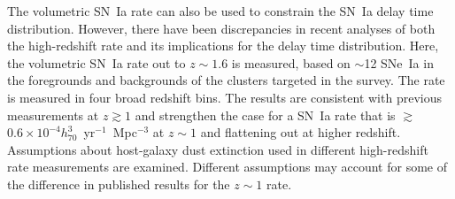 The volumetric SN~Ia rate can also be used to constrain the SN~Ia
delay time distribution. However, there have been discrepancies in
recent analyses of both the high-redshift rate and its implications
for the delay time distribution.  Here, the volumetric SN~Ia rate out
to $z \sim 1.6$ is measured, based on $\sim$12 SNe~Ia in the
foregrounds and backgrounds of the clusters targeted in the survey.
The rate is measured in four broad redshift bins. The results are
consistent with previous measurements at $z \gtrsim 1$ and strengthen
the case for a SN~Ia rate that is $\gtrsim$$0.6 \times 10^{-4}
h_{70}^{3}$~yr$^{-1}$~Mpc$^{-3}$ at $z \sim 1$ and flattening out at
higher redshift. Assumptions about host-galaxy dust extinction used in
different high-redshift rate measurements are examined. Different
assumptions may account for some of the difference in published
results for the $z \sim 1$ rate.
